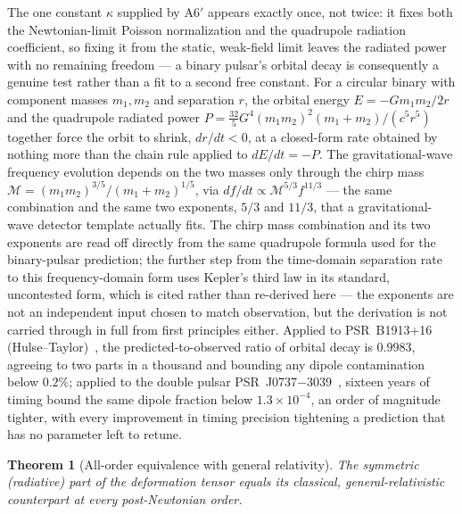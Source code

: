 \documentclass[pdflatex,sn-mathphys-num]{sn-jnl}
\theoremstyle{thmstyleone}
\newtheorem{theorem}{Theorem}
\theoremstyle{thmstylethree}
\theoremstyle{thmstyletwo}
\begin{document}
The one constant $\kappa$ supplied by A6$'$ appears exactly once, not
twice: it fixes both the Newtonian-limit Poisson normalization and the
quadrupole radiation coefficient, so fixing it from the static, weak-field
limit leaves the radiated power with no remaining freedom — a binary
pulsar's orbital decay is consequently a genuine test rather than a fit
to a second free constant. For a circular binary with component masses
$m_1, m_2$ and separation $r$, the orbital energy $E=-Gm_1m_2/2r$ and the
quadrupole radiated power
$P = \tfrac{32}{5}G^4(m_1m_2)^2(m_1+m_2)/(c^5r^5)$ together force the
orbit to shrink, $dr/dt<0$, at a closed-form rate obtained by nothing
more than the chain rule applied to $dE/dt=-P$. The gravitational-wave
frequency evolution depends on the two masses only through the chirp
mass $\mathcal{M}=(m_1m_2)^{3/5}/(m_1+m_2)^{1/5}$, via
$df/dt \propto \mathcal{M}^{5/3}f^{11/3}$ — the same combination and the
same two exponents, $5/3$ and $11/3$, that a gravitational-wave detector
template actually fits. The chirp mass combination and its two exponents
are read off directly from the same quadrupole formula used for the
binary-pulsar prediction; the further step from the time-domain
separation rate to this frequency-domain form uses Kepler's third law in
its standard, uncontested form, which is cited rather than re-derived
here — the exponents are not an independent input chosen to match
observation, but the derivation is not carried through in full from
first principles either. Applied to PSR~B1913+16
(Hulse–Taylor)~\cite{HulseTaylor1975,WeisbergHuang2016}, the
predicted-to-observed
ratio of orbital decay is $0.9983$, agreeing to two parts in a thousand
and bounding any dipole contamination below $0.2\%$; applied to the
double pulsar PSR~J0737$-$3039~\cite{Kramer2021}, sixteen years of timing bound the same
dipole fraction below $1.3\times10^{-4}$, an order of magnitude tighter,
with every improvement in timing precision tightening a prediction that
has no parameter left to retune.

\begin{theorem}[All-order equivalence with general relativity]\label{thm:allorder}
The symmetric (radiative) part of the deformation tensor equals its
classical, general-relativistic counterpart at \emph{every}
post-Newtonian order.
\end{theorem}
\end{document}
